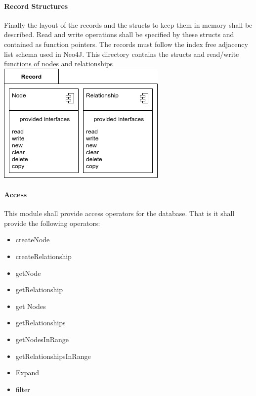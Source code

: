             
            \paragraph{Record Structures}
            Finally the layout of the records and the structs to keep them in memory shall be described. Read and write operations shall be specified by these structs and contained as function pointers. The records must follow the index free adjacency list schema used in Neo4J.  
            This directory contains the structs and read/write functions of nodes and relationships \\
            
            \includegraphics[keepaspectratio, width=\textwidth]{img/record_arch.png} \\

			
			\paragraph{Access}
				This module shall provide access operators for the database. That is it shall provide the following operators:
				\begin{itemize}
				 \item createNode
				 \item createRelationship
				 \item getNode
				 \item getRelationship
				 \item get Nodes
				 \item getRelationships
				 \item getNodesInRange
				 \item getRelationshipsInRange
				 \item Expand
				 \item filter
				\end{itemize}
                

